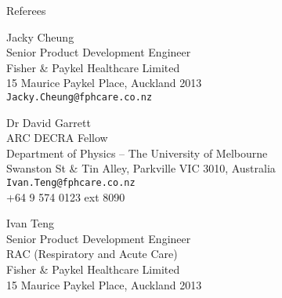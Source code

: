 \documentclass[11pt]{tracv}
\begin{document}
\begin{columnsection}{Referees}

\begin{multicols}{2}

    	Jacky Cheung\\
	Senior Product Development Engineer\\ 
	Fisher \& Paykel Healthcare Limited\\
	15 Maurice Paykel Place, Auckland 2013\\ 
	\texttt{Jacky.Cheung@fphcare.co.nz}\\

	\vspace{0.15cm}

	Dr David Garrett\\
	ARC DECRA Fellow\\
	Department of Physics -- The University of Melbourne\\
	Swanston St & Tin Alley, Parkville VIC 3010, Australia\\
	\texttt{Ivan.Teng@fphcare.co.nz}\\
	+64 9 574 0123 ext 8090\\

	\vspace{0.15cm}
	\columnbreak

	Ivan Teng\\
	Senior Product Development Engineer\\
	RAC (Respiratory and Acute Care)\\
	Fisher \& Paykel Healthcare Limited\\
	15 Maurice Paykel Place, Auckland 2013\\

\end{multicols}

\end{columnsection}
\end{document}
